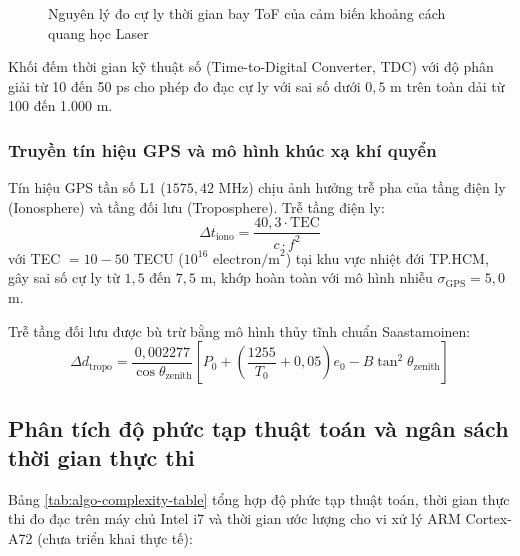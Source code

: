 \begin{figure}[H]
{%
}
\caption{Nguyên lý đo cự ly thời gian bay ToF của cảm biến khoảng cách quang học Laser}
\label{fig:laser-tof}
\end{figure}

Khối đếm thời gian kỹ thuật số (Time-to-Digital Converter, TDC) với độ phân giải từ 10 đến 50 ps cho phép đo đạc cự ly với sai số dưới $0{,}5$ m trên toàn dải từ 100 đến 1.000 m.

\subsubsection{Truyền tín hiệu GPS và mô hình khúc xạ khí quyển}

\hspace{0.5cm} Tín hiệu GPS tần số L1 ($1575{,}42$ MHz) chịu ảnh hưởng trễ pha của tầng điện ly (Ionosphere) và tầng đối lưu (Troposphere). Trễ tầng điện ly:
\begin{equation}
\Delta t_{\text{iono}} = \frac{40{,}3 \cdot \text{TEC}}{c \cdot f^2}
\label{eq:ionospheric-delay-formula}
\end{equation}
với TEC $= 10 - 50$ TECU ($10^{16}\text{ electron/m}^2$) tại khu vực nhiệt đới TP.HCM, gây sai số cự ly từ $1{,}5$ đến $7{,}5$ m, khớp hoàn toàn với mô hình nhiễu $\sigma_{\text{GPS}} = 5{,}0$ m.

Trễ tầng đối lưu được bù trừ bằng mô hình thủy tĩnh chuẩn Saastamoinen:
\begin{equation}
\Delta d_{\text{tropo}} = \frac{0{,}002277}{\cos\theta_{\text{zenith}}} \left[ P_0 + \left( \frac{1255}{T_0} + 0{,}05 \right) e_0 - B \tan^2\theta_{\text{zenith}} \right]
\label{eq:saastamoinen-tropospheric-model}
\end{equation}

\subsection{Phân tích độ phức tạp thuật toán và ngân sách thời gian thực thi}

\hspace{0.5cm} Bảng \ref{tab:algo-complexity-table} tổng hợp độ phức tạp thuật toán, thời gian thực thi đo đạc trên máy chủ Intel i7 và thời gian ước lượng cho vi xử lý ARM Cortex-A72 (chưa triển khai thực tế):

